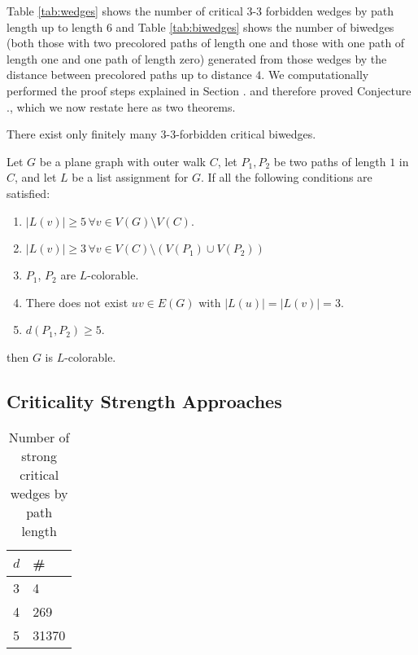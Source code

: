 Table \ref{tab:wedges} shows the number of critical 3-3 forbidden wedges by path length up to
length $6$ and Table \ref{tab:biwedges} shows the number of biwedges (both those with two precolored
paths of length one and those with one path of length one and one path of length zero) generated
from those wedges by the distance between precolored paths up to distance $4$. We computationally performed the proof steps explained in Section . and therefore proved Conjecture ., which
we now restate here as two theorems. 


\begin{theorem}
There exist only finitely many 3-3-forbidden critical biwedges.
\end{theorem}

\begin{theorem}
Let $G$ be a plane graph with outer walk $C$, let $P_1, P_2$ be two paths of length $1$ in $C$, and let
$L$ be a list assignment for $G$. If all the following conditions are satisfied:

\begin{enumerate}
	\item $|L(v)| \geq 5 \, \forall v \in V(G) \setminus V(C)$.
	\item $|L(v)| \geq 3 \, \forall v \in V(C) \setminus (V(P_1) \cup V(P_2))$
	\item $P_1$, $P_2$ are $L$-colorable.
	\item There does not exist $uv \in E(G)$ with $|L(u)| = |L(v)| = 3$.
	\item $d(P_1, P_2) \geq 5$.
\end{enumerate}

then $G$ is $L$-colorable. 
\end{theorem}




\subsection{Criticality Strength Approaches}

\begin{table}[h]
\label{tab:strongwedges}
\centering
\begin{tabular}{l | l}
$d$ & \# \\
\hline
3 & 4 \\
4 & 269\\ 
5 & 31370 \\
\end{tabular}
\caption{Number of strong critical wedges by path length}
\end{table}

